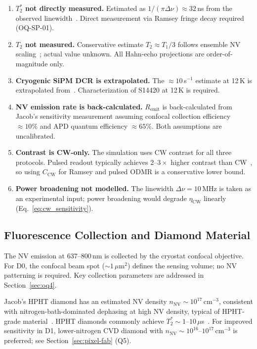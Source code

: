 \begin{enumerate}
  \item \textbf{$T_2^*$ not directly measured.} Estimated as $1/(\pi\Delta\nu) \approx 32$\,ns
    from the observed linewidth~\cite{Barry2020}. Direct measurement via Ramsey fringe decay
    required (OQ-SP-01).
  \item \textbf{$T_2$ not measured.} Conservative estimate $T_2 \approx T_1/3$ follows
    ensemble NV scaling~\cite{Jarmola2012}; actual value unknown. All Hahn-echo projections
    are order-of-magnitude only.
  \item \textbf{Cryogenic SiPM DCR is extrapolated.} The $\approx 10$\,s$^{-1}$ estimate
    at 12\,K is extrapolated from~\cite{Liu2022SiPMLN2}. Characterization of S14420 at
    12\,K is required.
  \item \textbf{NV emission rate is back-calculated.} $R_\mathrm{emit}$ is back-calculated
    from Jacob's sensitivity measurement assuming confocal collection efficiency $\approx 10\%$
    and APD quantum efficiency $\approx 65\%$. Both assumptions are uncalibrated.
  \item \textbf{Contrast is CW-only.} The simulation uses CW contrast for all three
    protocols. Pulsed readout typically achieves $2$--$3\times$ higher contrast than
    CW~\cite{Dreau2011Avoiding}, %
    so using $C_\mathrm{CW}$ for Ramsey and pulsed ODMR is a conservative lower bound.
  \item \textbf{Power broadening not modelled.} The linewidth $\Delta\nu = 10$\,MHz is
    taken as an experimental input; power broadening would degrade $\eta_\mathrm{CW}$
    linearly (Eq.~\eqref{eq:cw_sensitivity}).
\end{enumerate}

\subsection{Fluorescence Collection and Diamond Material}
\label{sec:nv-material}

The NV emission at 637--800\,nm is collected by the cryostat confocal objective.
For D0, the confocal beam spot ($\sim\!1\,\mu$m$^2$) defines the sensing volume; no NV
patterning is required. Key collection parameters are addressed in
Section~\ref{sec:oq4}.

Jacob's HPHT diamond has an estimated NV density
$n_\mathrm{NV} \sim 10^{17}$\,cm$^{-3}$, consistent with nitrogen-bath-dominated
dephasing at high NV density, typical of HPHT-grade material~\cite{Barry2020}. %
HPHT diamonds commonly achieve $T_2^* \sim 1$--$10\,\mu$s~\cite{Barry2020}. %
For improved sensitivity in D1, lower-nitrogen CVD diamond with
$n_\mathrm{NV} \sim 10^{16}$--$10^{17}$\,cm$^{-3}$ is preferred;
see Section~\ref{sec:pixel-fab} (Q5).

